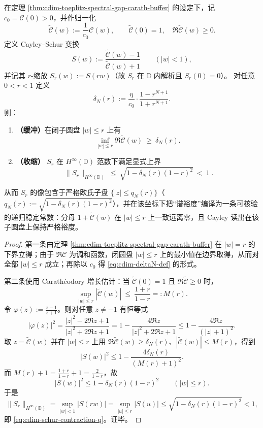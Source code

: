 \begin{theorem}[谱隙 \texorpdfstring{$\Rightarrow$}{=>} 缓冲 \texorpdfstring{$\Rightarrow$}{=>} Cayley--Schur 子盘收缩]\label{thm:cdim-toeplitz-gap-schur-contraction}
在定理 \ref{thm:cdim-toeplitz-spectral-gap-carath-buffer} 的设定下，记 \(c_0=\mathscr{C}(0)>0\)，并作归一化
\[
\widetilde{\mathscr{C}}(w):=\frac{1}{c_0}\mathscr{C}(w),
\qquad
\widetilde{\mathscr{C}}(0)=1,\quad \Re\widetilde{\mathscr{C}}(w)\ge 0.
\]
定义 Cayley--Schur 变换
\[
S(w):=\frac{\widetilde{\mathscr{C}}(w)-1}{\widetilde{\mathscr{C}}(w)+1}\qquad(|w|<1),
\]
并记其 \(r\)-缩放 \(S_r(w):=S(rw)\)（故 \(S_r\) 在 \(\mathbb{D}\) 内解析且 \(S_r(0)=0\)）。
对任意 \(0<r<1\) 定义
\begin{equation}\label{eq:cdim-deltaN-def}
\delta_N(r):=\frac{\eta}{c_0}\cdot\frac{1-r^{N+1}}{1+r^{N+1}}.
\end{equation}
则：
\begin{enumerate}
  \item \textbf{（缓冲）}在闭子圆盘 \(|w|\le r\) 上有
  \[
  \inf_{|w|\le r}\Re\widetilde{\mathscr{C}}(w)\ \ge\ \delta_N(r).
  \]
  \item \textbf{（收缩）} \(S_r\) 在 \(H^\infty(\mathbb{D})\) 范数下满足显式上界
  \begin{equation}\label{eq:cdim-schur-contraction-q}
  \boxed{\;
  \|S_r\|_{H^\infty(\mathbb{D})}\ \le\ \sqrt{1-\delta_N(r)(1-r)^2}\ <\ 1\; }.
  \end{equation}
\end{enumerate}
从而 \(S_r\) 的像包含于严格欧氏子盘 \(\{|z|\le q_N(r)\}\)（\(q_N(r):=\sqrt{1-\delta_N(r)(1-r)^2}\)），并在该坐标下把“谱裕度”编译为一条可核验的递归稳定常数：分母 \(1+ \widetilde{\mathscr{C}}(w)\) 在 \(|w|\le r\) 上一致远离零，且 Cayley 读出在该子圆盘上保持严格裕度。
\end{theorem}
\begin{proof}
第一条由定理 \ref{thm:cdim-toeplitz-spectral-gap-carath-buffer} 在 \(|w|=r\) 的下界立得；由于 \(\Re\mathscr{C}\) 为调和函数，闭圆盘 \(|w|\le r\) 上的最小值在边界取得，从而对全部 \(|w|\le r\) 成立；再除以 \(c_0\) 得 \eqref{eq:cdim-deltaN-def} 的形式。
\par
第二条使用 Carath\'eodory 增长估计：当 \(\widetilde{\mathscr{C}}(0)=1\) 且 \(\Re\widetilde{\mathscr{C}}\ge 0\) 时，
\[
\sup_{|w|\le r}|\widetilde{\mathscr{C}}(w)|\ \le\ \frac{1+r}{1-r}=:M(r).
\]
令 \(\varphi(z):=\frac{z-1}{z+1}\)。则对任意 \(z\neq -1\) 有恒等式
\[
|\varphi(z)|^2
=\frac{|z|^2-2\Re z+1}{|z|^2+2\Re z+1}
=1-\frac{4\Re z}{|z|^2+2\Re z+1}
\le 1-\frac{4\Re z}{(|z|+1)^2}.
\]
取 \(z=\widetilde{\mathscr{C}}(w)\) 并在 \(|w|\le r\) 上用
\(\Re \widetilde{\mathscr{C}}(w)\ge \delta_N(r)\)、\(|\widetilde{\mathscr{C}}(w)|\le M(r)\)，得到
\[
|S(w)|^2\le 1-\frac{4\delta_N(r)}{(M(r)+1)^2}.
\]
而 \(M(r)+1=\frac{1+r}{1-r}+1=\frac{2}{1-r}\)，故
\[
|S(w)|^2\le 1-\delta_N(r)(1-r)^2\qquad(|w|\le r).
\]
于是
\[
\|S_r\|_{H^\infty(\mathbb{D})}
=\sup_{|w|<1}|S(rw)|
=\sup_{|u|\le r}|S(u)|
\le \sqrt{1-\delta_N(r)(1-r)^2}<1,
\]
即 \eqref{eq:cdim-schur-contraction-q}。证毕。
\end{proof}


